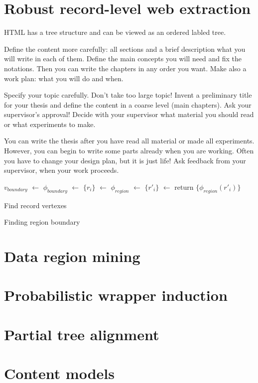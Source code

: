 \chapter{Robust record-level web extraction}

HTML has a tree structure and can be viewed as an ordered labled tree.

Define the content more carefully: all sections and a brief description what you will write in each of them. Define the main concepts you will need and fix the notations. Then you can write the chapters in any order you want. Make also a work plan: what you will do and when.

Specify your topic carefully. Don’t take too large topic!  Invent a preliminary title for your thesis and define the content in a coarse level (main chapters). Ask your supervisor’s approval! Decide with your supervisor what material you should read or what experiments to make.  

You can write the thesis after you have read all material or made all experiments. However, you can begin to write some parts already when you are working. Often you have to change your design plan, but it is just life! Ask feedback from your supervisor, when your work proceeds.

\IncMargin{2em}
\begin{algorithm}
	\DontPrintSemicolon
	\BlankLine

	$v_{boundary}$ $\leftarrow$ \;
	$\phi_{boundary}$ $\leftarrow$ \;
	$\{r_{i}\}$ $\leftarrow$ \;
	$\phi_{region}$ $\leftarrow$ \;
	$\{r'_{i}\}$ $\leftarrow$ \;
	return $\{ \phi_{region}(r'_i) \}$

	\caption{Find record vertexes}
\end{algorithm}
\DecMargin{2em}

\IncMargin{2em}
\begin{algorithm}
	\DontPrintSemicolon
	\BlankLine


	\caption{Finding region boundary}
\end{algorithm}
\DecMargin{2em}

\chapter{Data region mining}
\chapter{Probabilistic wrapper induction}
\chapter{Partial tree alignment}
\chapter{Content models}

